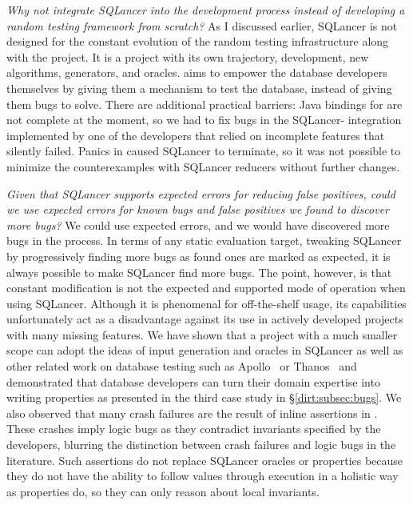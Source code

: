 \emph{Why not integrate SQLancer into the development process instead of developing
  a random testing framework from scratch?} As I discussed earlier, SQLancer
is not designed for the constant evolution of the random testing infrastructure
along with the project. It is a project with its own trajectory, development, new
algorithms, generators, and oracles.
\tool{} aims to empower the database developers themselves by giving them a
mechanism to test the database, instead of giving them bugs to solve. There are
additional practical barriers: Java bindings for \db{} are not complete at the
moment, so we had to fix bugs in the SQLancer-\db{} integration implemented by one of
the \db{} developers that relied on incomplete features that silently failed. Panics
in \db{} caused SQLancer to terminate, so it was not possible to minimize the
counterexamples with SQLancer reducers without further changes.

\emph{Given that SQLancer supports expected errors for reducing false positives,
  could we use expected errors for known bugs and false positives we found to
  discover more bugs?} We could use expected errors, and we would have discovered
more bugs in the process. In terms of any static evaluation target, tweaking
SQLancer by progressively finding more bugs as found ones are marked as expected,
it is always possible to make SQLancer find more bugs. The point, however, is
that constant modification is not the expected and supported mode of operation
when using SQLancer. Although it is phenomenal for off-the-shelf usage, its
capabilities unfortunately act as a disadvantage against its use in actively developed
projects with many missing features. We have shown that a project with a much smaller
scope can adopt the ideas of input generation and oracles in SQLancer as well as other
related work on database testing such as Apollo~\cite{apollo} or Thanos~\cite{thanos}
and demonstrated that database developers can turn their domain expertise into writing
properties as presented in the third case study in \S \ref{dirt:subsec:bugs}.
We also observed that many crash failures are the result of inline assertions in \db{}.
These crashes imply logic bugs as they contradict invariants specified by the developers,
blurring the distinction between crash failures and logic bugs in the literature. Such
assertions do not replace SQLancer oracles or \db{} properties because they do not have
the ability to follow values through execution in a holistic way as properties do, so
they can only reason about local invariants.

